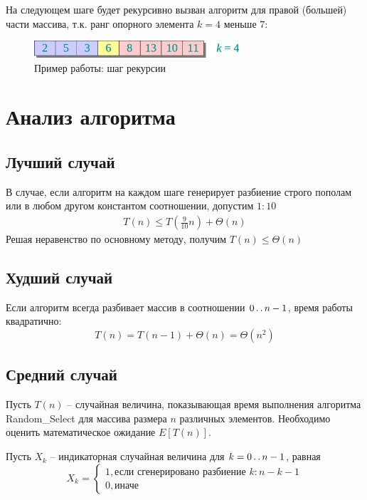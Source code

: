 \documentclass[11pt]{article}
\begin{document}
На следующем шаге будет рекурсивно вызван алгоритм для правой (большей) части массива, т.к. ранг опорного элемента $k=4$ меньше $7$:
\begin{figure}[ht]
  \centering
  \includegraphics[width=3in]{lecture6/example2.eps}
  \caption{Пример работы: шаг рекурсии}
  \label{fig:example2}
\end{figure}

\section{Анализ алгоритма}
\subsection{Лучший случай}
В случае, если алгоритм на каждом шаге генерирует разбиение строго пополам или в любом другом константом соотношении, допустим $1{:}10$
\begin{align*}
  T(n) \leqslant T(\frac{9}{10}n) + \Theta(n)
\end{align*}
Решая неравенство по основному методу, получим $T(n) \leqslant \Theta(n)$

\subsection{Худший случай}
Если алгоритм всегда разбивает массив в соотношении $0 \mathinner{\ldotp\ldotp} n-1$, время работы квадратично:
\begin{equation*}
  T(n) = T(n-1) + \Theta(n) = \Theta(n^2)
\end{equation*}

\subsection{Средний случай}
Пусть $T(n)$ -- случайная величина, показывающая время выполнения алгоритма Random\_Select для массива размера $n$ различных элементов. Необходимо оценить математическое ожидание $E[T(n)]$.

Пусть $X_k$ -- индикаторная случайная величина для $k = 0 \mathinner{\ldotp\ldotp} n-1$, равная
\begin{equation*}
  X_k = \begin{cases}
      1, \text{если сгенерировано разбиение } k:n-k-1 \\
      0, \text{иначе}
  \end{cases}
\end{equation*}
\end{document}
